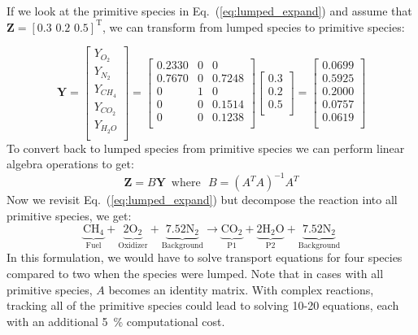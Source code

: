If we look at the primitive species in Eq.~(\ref{eq:lumped_expand}) and assume that $\mathbf{Z} = [0.3\, \, 0.2\, \, 0.5]^\mathrm{T}$, we can transform from lumped species to primitive species:

\begin{displaymath}
\mathbf{Y}=\left[\begin{array}{c}
       Y_{O_2} \\
       Y_{N_2} \\
       Y_{CH_4} \\
       Y_{CO_2} \\
       Y_{H_2O} \\
     \end{array}\right]
     =\left[\begin{array}{ccc}
     0.2330 & 0 & 0 \\
     0.7670 & 0 & 0.7248 \\
     0 & 1 & 0 \\
     0 & 0 & 0.1514 \\
     0 & 0 & 0.1238 \\
     \end{array}\right]
     \left[\begin{array}{c}
     0.3 \\
     0.2 \\
     0.5 \\
     \end{array}\right]
     =\left[\begin{array}{c}
     0.0699\\
     0.5925\\
     0.2000\\
     0.0757\\
     0.0619\\
     \end{array}\right]
\end{displaymath}
To convert back to lumped species from primitive species we can perform linear algebra operations to get:
\begin{equation}\label{eq:transform_back}
\textbf{Z}=B\textbf{Y} \, \, \, \text{where} \, \, \, \, B=(A^TA)^{-1}A^T
\end{equation}
Now we revisit Eq.~(\ref{eq:lumped_expand}) but decompose the reaction into all primitive species, we get:
\begin{equation}\label{eq:prim}
\underbrace{\mbox{CH}_4}_\text{Fuel}+\underbrace{2\mbox{O}_2}_\text{Oxidizer}+\underbrace{7.52\mbox{N}_2}_\text	{Background}\rightarrow \underbrace{\mbox{CO}_2}_\text{P1}+\underbrace{2\mbox{H}_2\mbox{O}}_\text{P2}+\underbrace{7.52\mbox{N}_2}_\text{Background}
\end{equation}
In this formulation, we would have to solve transport equations for four species compared to two when the species were lumped. Note that in cases with all primitive species, $A$ becomes an identity matrix. With complex reactions, tracking all of the primitive species could lead to solving 10-20 equations, each with an additional 5~\% computational cost.

